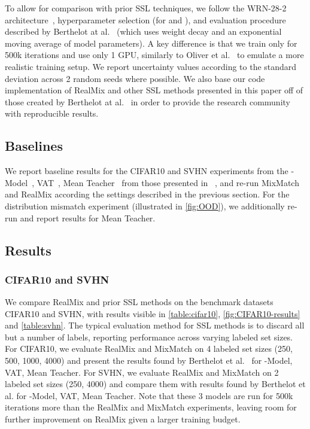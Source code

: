 \documentclass[10pt,twocolumn,letterpaper]{article}
\begin{document}
To allow for comparison with prior SSL techniques, we follow the WRN-28-2 architecture~\cite{wrnZagoruyko}, hyperparameter selection (for  and ), and evaluation procedure described by Berthelot at al.~\cite{mixmatchBerthelot} (which uses weight decay and an exponential moving average of model parameters). A key difference is that we train only for 500k iterations and use only 1 GPU, similarly to Oliver et al.~\cite{realisticevalOliver} to emulate a more realistic training setup. We report uncertainty values according to the standard deviation across 2 random seeds where possible. We also base our code implementation of RealMix and other SSL methods presented in this paper off of those created by Berthelot at al.~\cite{mixmatchBerthelot} in order to provide the research community with reproducible results.

\subsection{Baselines}
We report baseline results for the CIFAR10 and SVHN experiments from the -Model~\cite{temporalensemblingLaine}, VAT~\cite{vatMiyato}, Mean Teacher~\cite{meanteacherTarvainen} from those presented in ~\cite{mixmatchBerthelot}, and re-run MixMatch~\cite{mixmatchBerthelot} and RealMix according the settings described in the previous section. For the distribution mismatch experiment (illustrated in \cref{fig:OOD}), we additionally re-run and report results for Mean Teacher.
\subsection{Results}

\subsubsection{CIFAR10 and SVHN}

We compare RealMix and prior SSL methods on the benchmark datasets CIFAR10 and SVHN, with results visible in \cref{table:cifar10}, \cref{fig:CIFAR10-results} and \cref{table:svhn}. The typical evaluation method for SSL methods is to discard all but a number of labels, reporting performance across varying labeled set sizes. For CIFAR10, we evaluate RealMix and MixMatch \cite{mixmatchBerthelot} on 4 labeled set sizes (250, 500, 1000, 4000) and present the results found by Berthelot et al.~\cite{mixmatchBerthelot} for -Model, VAT, Mean Teacher. For SVHN, we evaluate RealMix and MixMatch on 2 labeled set sizes (250, 4000) and compare them with results found by Berthelot et al.\cite{mixmatchBerthelot} for -Model, VAT, Mean Teacher. Note that these 3 models are run for 500k iterations more than the RealMix and MixMatch experiments, leaving room for further improvement on RealMix given a larger training budget.
\end{document}
